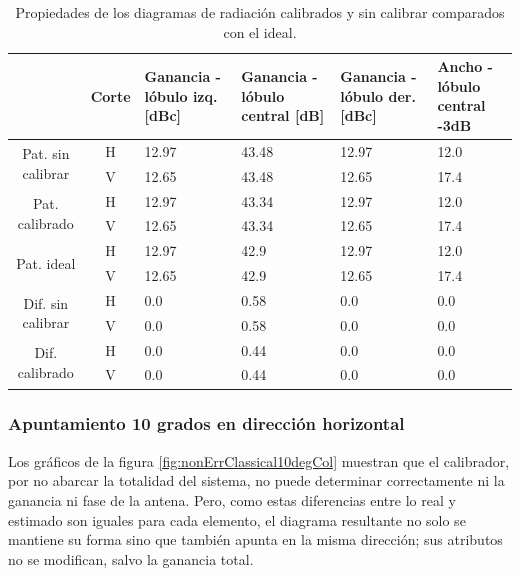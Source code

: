 \begin{table}[H]
  \footnotesize
  \centering
  \begin{tabular}{|c|c|p{2cm}|p{2.5cm}|p{2.5cm}|p{2.5cm}|}
    \cline{2-6}
    \multicolumn{1}{c|}{} & Corte & Ganancia - lóbulo izq. [dBc] & Ganancia - lóbulo central [dB] &
    Ganancia - lóbulo der. [dBc] & Ancho - lóbulo central -3dB \tabularnewline\hline
    \multirow{2}{2cm}{Pat. sin calibrar} & H & 12.97 & 43.48 & 12.97 & 12.0 \tabularnewline\cline{2-6}
     & V & 12.65 & 43.48 & 12.65 & 17.4 \tabularnewline\hline
    \multirow{2}{2cm}{Pat. calibrado} & H & 12.97 & 43.34 & 12.97 & 12.0 \tabularnewline\cline{2-6}
     & V & 12.65 & 43.34 & 12.65 & 17.4 \tabularnewline\hline
    \multirow{2}{2cm}{Pat. ideal} & H & 12.97 & 42.9 & 12.97 & 12.0 \tabularnewline\cline{2-6}
     & V & 12.65 & 42.9 & 12.65 & 17.4 \tabularnewline\hline
    \multirow{2}{2cm}{Dif. sin calibrar} & H & 0.0 & 0.58 & 0.0 & 0.0\tabularnewline\cline{2-6}
     & V & 0.0 & 0.58 & 0.0 & 0.0 \tabularnewline\hline
    \multirow{2}{2cm}{Dif. calibrado} & H & 0.0 & 0.44 & 0.0 & 0.0 \tabularnewline\cline{2-6}
     & V & 0.0 & 0.44 & 0.0 & 0.0 \tabularnewline\hline
  \end{tabular}
  \caption{Propiedades de los diagramas de radiación calibrados y sin calibrar comparados con el ideal.}
  \label{tab:nonErrClassical0deg}
\end{table}

\subsubsection{Apuntamiento 10 grados en dirección horizontal}

Los gráficos de la figura \ref{fig:nonErrClassical10degCol} muestran que el calibrador, por no abarcar la totalidad del sistema,
no puede determinar correctamente ni la ganancia ni fase de la antena. Pero, como estas diferencias entre lo real y estimado son
iguales para cada elemento, el diagrama resultante no solo se mantiene su forma sino que también apunta en la misma dirección; 
sus atributos no se modifican, salvo la ganancia total.

